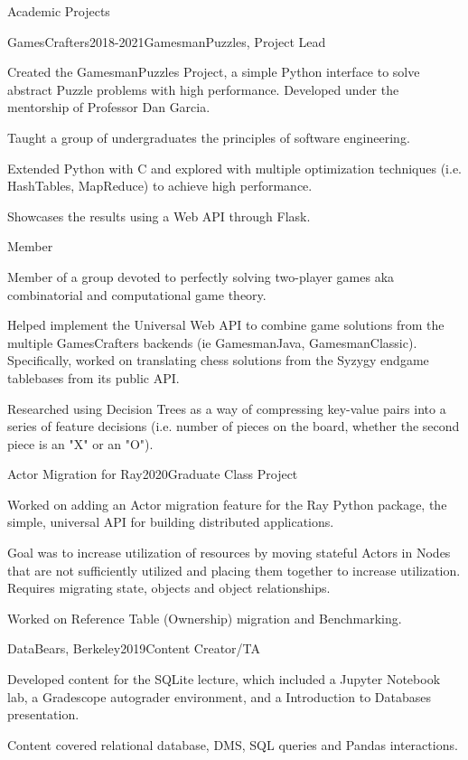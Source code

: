 \documentclass{resume} %
\begin{document}
\begin{rSection}{Academic Projects}

\begin{rSubsection}{GamesCrafters}{2018-2021}{GamesmanPuzzles, Project Lead}{}
	\item Created the GamesmanPuzzles Project, a simple Python interface to solve abstract Puzzle problems with high performance. Developed under the mentorship of Professor Dan Garcia.
	\item Taught a group of undergraduates the principles of software engineering.
	\item Extended Python with C and explored with multiple optimization techniques (i.e. HashTables, MapReduce) to achieve high performance.
	\item Showcases the results using a Web API through Flask.
\end{rSubsection}

\begin{rSubsubsection}{Member}{}
	\item Member of a group devoted to perfectly solving two-player games aka combinatorial and computational game theory.
	\item Helped implement the Universal Web API to combine game solutions from the multiple GamesCrafters backends (ie GamesmanJava, GamesmanClassic). 
	Specifically, worked on translating chess solutions from the Syzygy endgame tablebases from its public API.
	\item Researched using Decision Trees as a way of compressing key-value pairs into a series of feature decisions (i.e. number of pieces on the board, whether the second piece is an "X" or an "O").
\end{rSubsubsection}

\begin{rSubsection}{Actor Migration for Ray}{2020}{Graduate Class Project}{}
	\item Worked on adding an Actor migration feature for the Ray Python package, the simple, universal API for building distributed applications.
	\item Goal was to increase utilization of resources by moving stateful Actors in Nodes that are not sufficiently utilized and placing them together to increase utilization. Requires migrating state, objects and object relationships. 
	\item Worked on Reference Table (Ownership) migration and Benchmarking.
\end{rSubsection}

\begin{rSubsection}{DataBears, Berkeley}{2019}{Content Creator/TA}{}
    \item Developed content for the SQLite lecture, which included a Jupyter Notebook lab, a Gradescope autograder environment, and a Introduction to Databases presentation.
    \item Content covered relational database, DMS, SQL queries and Pandas interactions.
\end{rSubsection}    

\end{rSection}
\end{document}
